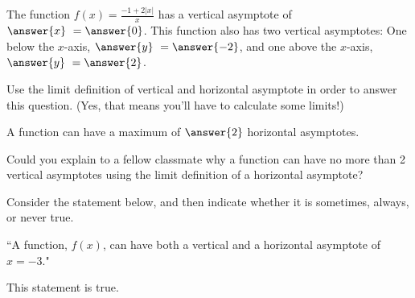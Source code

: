 \documentclass[handout]{ximera}
\begin{document}
\begin{exercise}

The function $f(x) = \frac{-1 + 2|x|}{x}$ has a vertical asymptote of $\answer{x} \ = \answer{0}$.  This function also has two vertical asymptotes: One below the $x$-axis, $\answer{y} \ = \answer{-2}$, and one above the $x$-axis, $\answer{y} \ = \answer{2}$.  

\begin{hint}

Use the limit definition of vertical and horizontal asymptote in order to answer this question.  (Yes, that means you'll have to calculate some limits!)

\end{hint}

\end{exercise}

\begin{exercise}

A function can have a maximum of $\answer{2}$ horizontal asymptotes.  

\begin{feedback}[correct]

Could you explain to a fellow classmate why a function can have no more than 2 vertical asymptotes using the limit definition of a horizontal asymptote?  

\end{feedback}

\end{exercise}

\begin{exercise}

Consider the statement below, and then indicate whether it is sometimes, always, or never true.

\begin{center} ``A function, $f(x)$, can have both a vertical and a horizontal asymptote of $x=-3$." \end{center}

This statement is  true.

\end{exercise}
\end{document}
